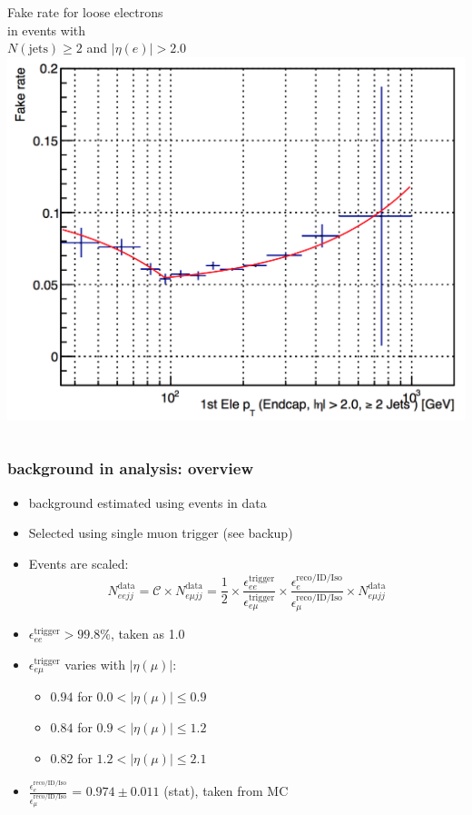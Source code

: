 \documentclass[bigger]{beamer}
\begin{document}
\begin{frame}
\begin{columns}
\begin{column}{0.45\textwidth}
\scriptsize
\centering
Fake rate for loose electrons \\ in events with \\ 
$N(\text{jets}) \geq 2$ and $|\eta(e)| > 2.0$
\includegraphics[width=\textwidth]{fig/qcd/End2_2Jet_Pt1stEle_PAS.png}
\end{column}
\end{columns}
\end{frame}
\begin{frame}
\frametitle{\ttbar background in \eejj analysis: overview}
\label{sec-2-2-4}
\label{sec-2-2-4-1}

\begin{itemize}
\item \ttbar background estimated using \emujj events in data
\item Selected using single muon trigger (see backup)
\item Events are scaled:
\begin{equation*}
  N_{eejj}^{\text{data}} = \mathcal{C} \times N_{e \mu jj}^{\text{data}} = \frac{1}{2} \times \frac{\epsilon^{\text{trigger}}_{ee}}{\epsilon^{\text{trigger}}_{e\mu}} \times \frac{\epsilon^{\text{reco} / \text{ID} / \text{Iso}}_{e}}{\epsilon^{\text{reco} / \text{ID} / \text{Iso}}_{\mu}} \times N_{e \mu jj}^{\text{data}}
\end{equation*}
\item $\epsilon^{\text{trigger}}_{ee} > 99.8\%$, taken as 1.0
\item $\epsilon^{\text{trigger}}_{e\mu}$ varies with $|\eta(\mu)|$:
\begin{itemize}
\item $0.94$ for $0.0 < |\eta(\mu)| \leq 0.9$
\item $0.84$ for $0.9 < |\eta(\mu)| \leq 1.2$
\item $0.82$ for $1.2 < |\eta(\mu)| \leq 2.1$
\end{itemize}
\item $\frac{\epsilon^{\text{reco} / \text{ID} / \text{Iso}}_{e}}{\epsilon^{\text{reco} / \text{ID} / \text{Iso}}_{\mu}}$
= $0.974 \pm 0.011$ (stat), taken from MC
\end{itemize}
\end{frame}
\end{document}
